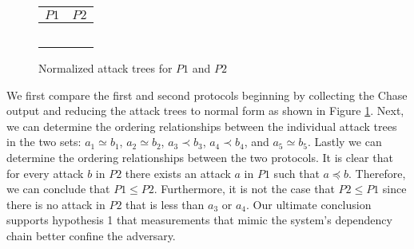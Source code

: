 \documentclass[runningheads]{llncs}
\theoremstyle{definition}
\begin{document}
\begin{figure}[h]
    \begin{center}
        \begin{tabular}{ M{6cm} | M{6cm} }
                $P1$ & $P2$ \\
                \hline
                &\\ 
                 \hspace{.03cm}  
                &  \hspace{.03cm}  \\ 
                &\\
                 \hspace{.03cm}  
                &    \\
                 
                 &  \\ 
            \end{tabular}
    \end{center}
    \caption{Normalized attack trees for $P1$ and $P2$}
    \label{fig:rtm-compare-reduced}
\end{figure}

We first compare the first and second protocols beginning by
collecting the Chase output and reducing the attack trees to normal
form as shown in Figure \ref{fig:rtm-compare-reduced}. Next, we can
determine the ordering relationships between the individual attack
trees in the two sets: $a_1 \simeq b_1$, $a_2 \simeq b_2$,
$a_3 \prec b_3$, $a_4 \prec b_4$, and $a_5 \simeq b_5$. Lastly we can
determine the ordering relationships between the two protocols. It is
clear that for every attack $b$ in $P2$ there exists an attack
$a$ in $P1$ such that $a \preceq b$. Therefore, we can conclude that
$P1 \leq P2$. Furthermore, it is not the case that $P2 \leq P1$ since
there is no attack in $P2$ that is less than $a_3$ or $a_4$. Our
ultimate conclusion supports hypothesis 1 that measurements that mimic
the system's dependency chain better confine the adversary.
\end{document}
